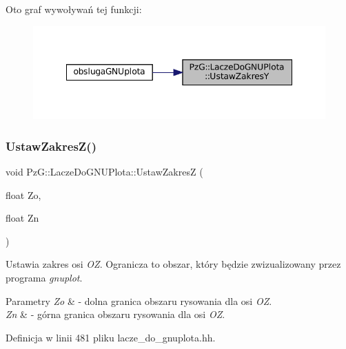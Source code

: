 Oto graf wywoływań tej funkcji\+:\nopagebreak
\begin{figure}[H]
\begin{center}
\leavevmode
\includegraphics[width=348pt]{class_pz_g_1_1_lacze_do_g_n_u_plota_a54c6e9cf9ab2eae479451fd953c2717c_icgraph}
\end{center}
\end{figure}
\mbox{\label{class_pz_g_1_1_lacze_do_g_n_u_plota_a1dbbb2b86fb13b8632e6bad9df2a82e3}} 
\subsubsection{\texorpdfstring{UstawZakresZ()}{UstawZakresZ()}}
{\footnotesize\ttfamily void Pz\+G\+::\+Lacze\+Do\+G\+N\+U\+Plota\+::\+Ustaw\+ZakresZ (\begin{DoxyParamCaption}\item[{float}]{Zo,  }\item[{float}]{Zn }\end{DoxyParamCaption})\hspace{0.3cm}{\ttfamily [inline]}}

Ustawia zakres osi {\itshape OZ}. Ogranicza to obszar, który będzie zwizualizowany przez programa {\itshape gnuplot}. 
\begin{DoxyParams}{Parametry}
{\em Zo} & -\/ dolna granica obszaru rysowania dla osi {\itshape OZ}. \\
\hline
{\em Zn} & -\/ górna granica obszaru rysowania dla osi {\itshape OZ}. \\
\hline
\end{DoxyParams}


Definicja w linii 481 pliku lacze\+\_\+do\+\_\+gnuplota.\+hh.

